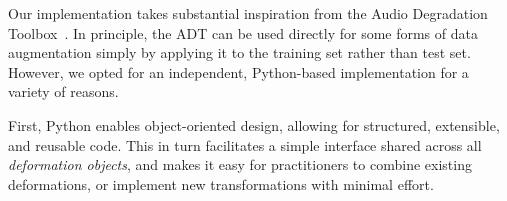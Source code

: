 \documentclass{article}
\begin{document}
%
%
Our implementation takes substantial inspiration from the Audio Degradation
Toolbox~\cite{mauch2013audio}.  In principle, the ADT can be used directly
for some forms of data augmentation simply by applying it to the training set 
rather than test set.
However, we opted for an independent, Python-based implementation for a variety of reasons.

%
First, Python enables object-oriented design, allowing for structured,
extensible, and reusable code.  This in turn facilitates a simple interface shared across
all \emph{deformation objects}, and makes it easy for practitioners to combine existing
deformations, or implement new transformations with minimal effort.

%
\end{document}
